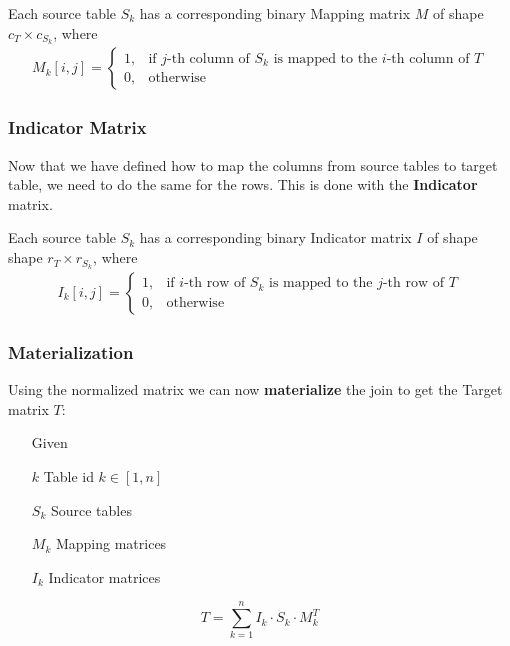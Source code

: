 \begin{definition}
    Each source table $S_k$ has a corresponding binary Mapping matrix $M$ of shape $c_T \times c_{S_k}$, where
    \begin{align*}
        M_k[i,j] = \begin{cases}
                       1, & \text{if $j$-th column of $S_k$ is mapped to the $i$-th column of $T$} \\
                       0, & \text{otherwise}
                   \end{cases}
    \end{align*}
\end{definition}


\subsubsection{Indicator Matrix}
Now that we have defined how to map the columns from source tables to target table, we need to do the same for the rows. This is done with the \textbf{Indicator} matrix.

\begin{definition}
    Each source table $S_k$ has a corresponding binary Indicator matrix $I$ of shape shape $r_T \times r_{S_k}$, where
    \begin{align*}
        I_k[i,j] = \begin{cases}
                       1, & \text{if $i$-th row of $S_k$ is mapped to the $j$-th row of $T$} \\
                       0, & \text{otherwise}
                   \end{cases}
    \end{align*}
\end{definition}



\subsubsection{Materialization}
Using the normalized matrix we can now \textbf{materialize} the join to get the Target matrix $T$:

\begin{definition}
    \begin{itemize}
        \item[]
        \item[] Given
        \item[$k$] Table id $k \in [1,n]$
        \item[$S_k$] Source tables
        \item[$M_k$] Mapping matrices
        \item[$I_k$] Indicator matrices
    \end{itemize}
    \[
        T = \sum_{k=1}^{n}  I_k \cdot S_k \cdot M^T_k
    \]

\end{definition}


